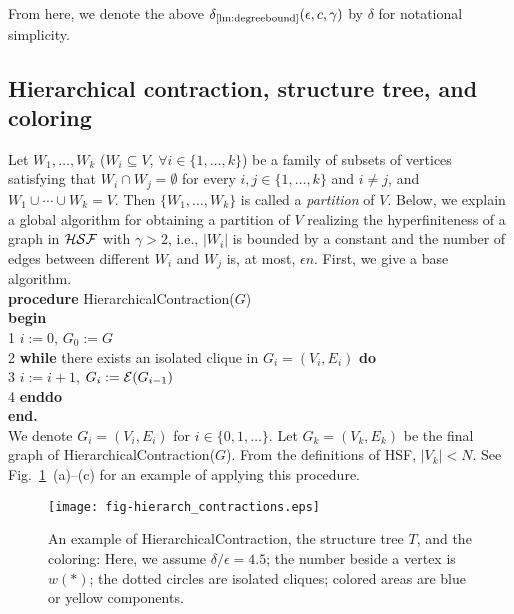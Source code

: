 \documentclass[11pt]{article}
\begin{document}
From here, we denote the above $\delta_{\scriptsize \ref{lm:degreebound}}(\epsilon, c,\gamma)$ by $\delta$ for notational simplicity. 





















\subsection{Hierarchical contraction, structure tree, and coloring}


Let $W_1, \ldots, W_k$ ($W_i \subseteq V$, $\forall i \in \{ 1, \ldots, k \}$) 
be a family of subsets of vertices satisfying that 
$W_i \cap W_j = \emptyset$ for every $i,j \in \{ 1, \ldots, k \}$ and $i \neq j$, 
and $W_1 \cup \cdots \cup W_k = V$. 
Then $\{ W_1, \ldots, W_k \}$ is called 
a {\em partition} of $V$. 
Below, we explain a global algorithm for obtaining a partition of $V$ realizing the hyperfiniteness 
of a graph in ${\cal HSF}$ with $\gamma >2$, i.e., 
$|W_i|$ is bounded by a constant and the number of edges between different $W_i$ and $W_j$ is, 
at most, $\epsilon n$. 
First, we give a base algorithm. \\




\noindent
\textbf{procedure} {\sc HierarchicalContraction}($G$)\\
\textbf{begin}\\
1 \hspace{1em} $i :=0$, $G_0:=G$\\
2 \hspace{1em} \textbf{while} 
there exists an isolated clique in $G_i =(V_i,E_i)$ \textbf{do}\\
3 \hspace{2em} $i := i+1$, $G_i:= {\cal E}(G_{i-1})$\\
4 \hspace{1em} \textbf{enddo}\\
\textbf{end.}\\


We denote $G_i =(V_i,E_i)$ for $i \in \{ 0, 1, \ldots \}$. 
Let $G_k = (V_k,E_k)$ be the final graph of {\sc HierarchicalContraction}($G$). 
From the definitions of HSF, 
$|V_k| < N$. 
See Fig.~\ref{fg:fig-hierarch_contractions}~(a)--(c) for 
an example of applying this procedure. 
\begin{figure}[bht]
\begin{center}
\texttt{[image: fig-hierarch\_contractions.eps]}
\end{center}
\caption{An example of {\sc HierarchicalContraction}, the structure tree $T$, and the coloring: 
Here, we assume $\delta/\epsilon = 4.5$; 
the number beside a vertex is $w(*)$; 
the dotted circles are isolated cliques; 
colored areas are blue or yellow components.}
\label{fg:fig-hierarch_contractions}
\end{figure}
\end{document}
